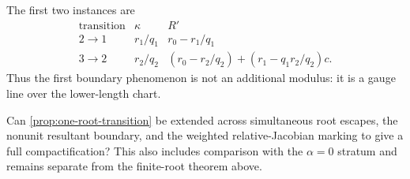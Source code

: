 The first two instances are
\[
\begin{array}{c|c|c}
\text{transition}&\kappa&R'\\ \hline
2\longrightarrow1&r_1/q_1&r_0-r_1/q_1\\[1mm]
3\longrightarrow2&r_2/q_2&(r_0-r_2/q_2)+(r_1-q_1r_2/q_2)c.
\end{array}
\]
Thus the first boundary phenomenon is not an additional modulus: it is a
gauge line over the lower-length chart.

\begin{question}
\label{q:all-multiplicity-infinity-gluing}
Can \cref{prop:one-root-transition} be extended across simultaneous root
escapes, the nonunit resultant boundary, and the weighted
relative-Jacobian marking to give a full compactification?  This also
includes comparison with the \(\alpha=0\) stratum and remains separate from
the finite-root theorem above.
\end{question}
